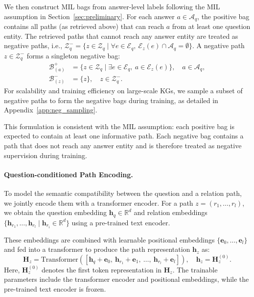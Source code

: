 \documentclass{article}
\begin{document}
We then construct MIL bags from answer-level labels following the MIL assumption in Section~\ref{sec:preliminary}. 
For each answer $a\in\mathcal{A}_q$, the positive bag contains all paths (as retrieved above) that can reach $a$ from at least one question entity. 
The retrieved paths that cannot reach any answer entity are treated as negative paths, i.e.,
$\mathcal{Z}_q^{-}=\{z\in\mathcal{Z}_q \mid \forall e\in\mathcal{E}_q,\ \mathcal{E}_z(e)\cap\mathcal{A}_q=\emptyset\}$.
A negative path $z\in\mathcal{Z}_q^{-}$ forms a singleton negative bag:
\begin{equation}
\begin{aligned}
\mathcal{B}_{(a)}^+
&=
\{z\in\mathcal{Z}_q \mid \exists e\in\mathcal{E}_q,\ a\in\mathcal{E}_z(e)\},
\quad a\in\mathcal{A}_q,\\
\mathcal{B}_{(z)}^-
&=
\{z\},
\quad z\in\mathcal{Z}_q^-.
\end{aligned}
\end{equation}
For scalability and training efficiency on large-scale KGs, we sample a subset of negative paths to form the negative bags during training, as detailed in Appendix~\ref{app:neg_sampling}.

This formulation is consistent with the MIL assumption: each positive bag is expected to contain at least one informative path. Each negative bag contains a path that does not reach any answer entity and is therefore treated as negative supervision during training.


\paragraph{Question-conditioned Path Encoding.}
To model the semantic compatibility between the question and a relation path, we jointly encode them with a transformer encoder.
For a path $z=(r_1,\ldots,r_l)$, we obtain the question embedding $\mathbf{h}_q\in\mathbb{R}^d$ and relation embeddings $\{\mathbf{h}_{r_1},\ldots,\mathbf{h}_{r_l} \mid \mathbf{h}_{r_i} \in \mathbb{R}^d\}$ using a pre-trained text encoder.

These embeddings are combined with learnable positional embeddings $\{\mathbf{e}_0,\ldots,\mathbf{e}_l\}$ and fed into a transformer to produce the path representation $\mathbf{h}_z$ as:
\begin{equation}
\mathbf{H}_z =
\mathrm{Transformer}
\left(
[\mathbf{h}_q+\mathbf{e}_0,\ \mathbf{h}_{r_1}+\mathbf{e}_1,\ \ldots,\ \mathbf{h}_{r_l}+\mathbf{e}_l]
\right), \quad \mathbf{h}_z = \mathbf{H}_z^{(0)}.
\end{equation} 
Here, $\mathbf{H}_z^{(0)}$ denotes the first token representation in $\mathbf{H}_z$.
The trainable parameters include the transformer encoder and positional embeddings, while the pre-trained text encoder is frozen.
\end{document}
